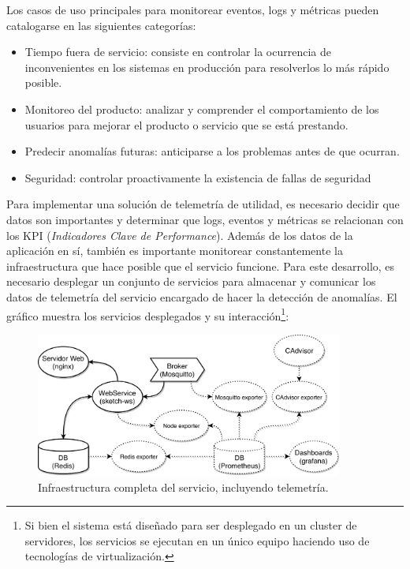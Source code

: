 \documentclass[a4paper,10pt, oneside]{article}
\begin{document}
Los casos de uso principales para monitorear eventos, logs y métricas pueden catalogarse en las siguientes categorías:
\begin{itemize}
	\item Tiempo fuera de servicio: consiste en controlar la ocurrencia de inconvenientes en los sistemas en producción para resolverlos lo más rápido posible.
	\item Monitoreo del producto: analizar y comprender el comportamiento de los usuarios para mejorar el producto o servicio que se está prestando.
	\item Predecir anomalías futuras: anticiparse a los problemas antes de que ocurran.
	\item Seguridad: controlar proactivamente la existencia de fallas de seguridad
\end{itemize}

Para implementar una solución de telemetría de utilidad, es necesario decidir que datos son importantes y determinar que logs, eventos y métricas se relacionan con los KPI (\textit{Indicadores Clave de Performance}). Además de los datos de la aplicación en sí, también es importante monitorear constantemente la infraestructura que hace posible que el servicio funcione. Para este desarrollo, es necesario desplegar un conjunto de servicios para almacenar y comunicar los datos de telemetría del servicio encargado de hacer la detección de anomalías. El gráfico muestra los servicios desplegados y su interacción\footnote{Si bien el sistema está diseñado para ser desplegado en un cluster de servidores, los servicios se ejecutan en un único equipo haciendo uso de tecnologías de virtualización.}:

\begin{figure}[h]
	\centering
	\includegraphics[width=0.9\textwidth]{./graph/service_infrastructure.pdf}
	\caption{Infraestructura completa del servicio, incluyendo telemetría.}
	\label{diag:service_infrastructure}
\end{figure}
\end{document}
